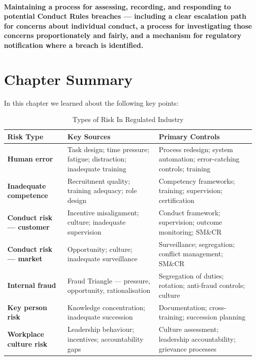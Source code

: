 \paragraph{\textbf{Maintaining a process for assessing, recording, and responding to potential Conduct Rules breaches} — including a clear escalation path for concerns about individual conduct, a process for investigating those concerns proportionately and fairly, and a mechanism for regulatory notification where a breach is identified.}

\newpage
\section{Chapter Summary}
In this chapter we learned about the following key points:

\begin{table}[H]
  \centering
  \renewcommand{\arraystretch}{1.5}
  \begin{tabularx}{\textwidth}{ | >{\raggedright\arraybackslash}p{} 
								| >{\raggedright\arraybackslash}p{} 
                                | >{\raggedright\arraybackslash}X | }
    \hline
    \textbf{Risk Type} & \textbf{Key Sources} & \textbf{Primary Controls} \\
    \hline
    \textbf{Human error} & Task design; time pressure; fatigue; distraction; inadequate training & Process redesign; system automation; error-catching controls; training\\
    \hline
    \textbf{Inadequate competence} & Recruitment quality; training adequacy; role design & Competency frameworks; training; supervision; certification\\
    \hline
    \textbf{Conduct risk — customer} & Incentive misalignment; culture; inadequate supervision & Conduct framework; supervision; outcome monitoring; SM\&CR\\
    \hline
    \textbf{Conduct risk — market} & Opportunity; culture; inadequate surveillance & Surveillance; segregation; conflict management; SM\&CR\\
    \hline
    \textbf{Internal fraud} & Fraud Triangle — pressure, opportunity, rationalisation & Segregation of duties; rotation; anti-fraud controls; culture\\
    \hline
    \textbf{Key person risk} & Knowledge concentration; inadequate succession & Documentation; cross-training; succession planning\\
    \hline
    \textbf{Workplace culture risk} & Leadership behaviour; incentives; accountability gaps & Culture assessment; leadership accountability; grievance processes\\
    \hline
  \end{tabularx}
  \caption{Types of Risk In Regulated Industry}
\end{table}

